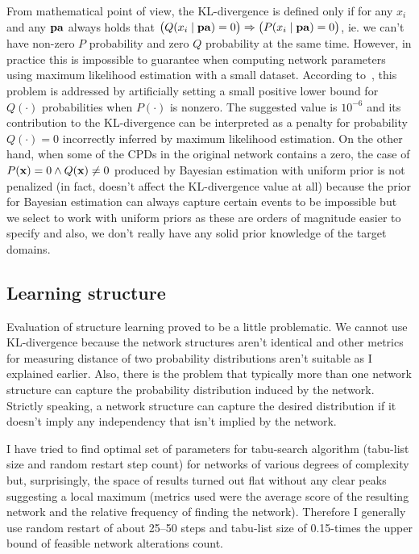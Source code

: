 \documentclass[english,cover]{fitthesis} %
\newcommand{\vars}[1]{{\bold{#1}}}         %
\begin{document}
From mathematical point of view, the KL-divergence is defined only if for any $x_i$ and any $\vars{pa}$ always holds that $\bigl( Q(x_i \mid \vars{pa}) = 0 \bigr) \Rightarrow \bigl( P(x_i \mid \vars{pa}) = 0 \bigr)$, ie. we can't have non-zero $P$ probability and zero $Q$ probability at the same time. However, in practice this is impossible to guarantee when computing network parameters using maximum likelihood estimation with a small dataset. According to~\cite{kl_divergence_wifi,kl_divergence_noisy_max}, this problem is addressed by artificially setting a small positive lower bound for $Q(\cdot)$ probabilities when $P(\cdot)$ is nonzero. The suggested value is $10^{-6}$ and its contribution to the KL-divergence can be interpreted as a penalty for probability $Q(\cdot) = 0$ incorrectly inferred by maximum likelihood estimation. On the other hand, when some of the CPDs in the original network contains a zero, the case of $P(\vars{x}) = 0 \land Q(\vars{x}) \neq 0$ produced by Bayesian estimation with uniform prior is not penalized (in fact, doesn't affect the KL-divergence value at all) because the prior for Bayesian estimation can always capture certain events to be impossible but we select to work with uniform priors as these are orders of magnitude easier to specify and also, we don't really have any solid prior knowledge of the target domains. 




\subsection{Learning structure}
Evaluation of structure learning proved to be a little problematic. We cannot use KL-divergence because the network structures aren't identical and other metrics for measuring distance of two probability distributions aren't suitable as I explained earlier. Also, there is the problem that typically more than one network structure can capture the probability distribution induced by the  network. Strictly speaking, a network structure can capture the desired distribution if it doesn't imply any independency that isn't implied by the  network.

I have tried to find optimal set of parameters for tabu-search algorithm (tabu-list size and random restart step count) for networks of various degrees of complexity but, surprisingly, the space of results turned out flat without any clear peaks suggesting a local maximum (metrics used were the average score of the resulting network and the relative frequency of finding the  network). Therefore I generally use random restart of about 25--50 steps and tabu-list size of 0.15-times the upper bound of feasible network alterations count.
\end{document}
